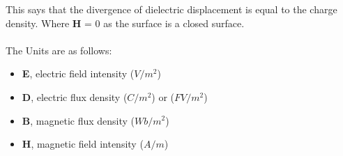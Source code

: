 This says that the divergence of dielectric displacement is  equal to the charge density. Where \textbf{H} = 0 as the surface is a closed surface.\\
\\
\noindent
The Units are as follows:

\begin{itemize}
    \item \textbf{E}, electric field intensity ($V/m^2$)
    \item \textbf{D}, electric flux density ($C/m^2$) or ($FV/m^2$)
    \item \textbf{B}, magnetic flux density ($Wb/m^2$)
    \item \textbf{H}, magnetic field intensity ($A/m$)
\end{itemize}